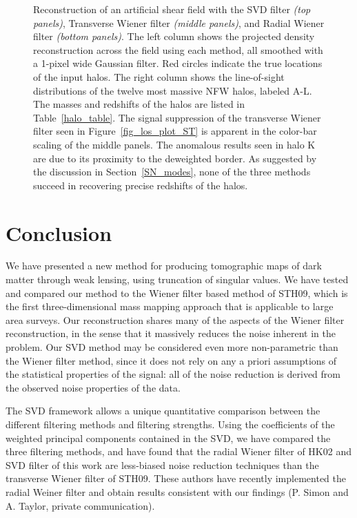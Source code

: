\documentclass[twocolumn]{emulateapj}
\begin{document}
\begin{figure*}%
 \centering
 \caption{
   Reconstruction of an artificial shear field with the 
   SVD filter \textit{(top panels)}, 
   Transverse Wiener filter \textit{(middle panels)}, 
   and Radial Wiener filter \textit{(bottom panels)}.  
   The left column shows the projected density reconstruction
   across the field using each method, all
   smoothed with a 1-pixel wide Gaussian filter.  
   Red circles indicate the true locations of the input halos.
   The right column shows the line-of-sight distributions of the
   twelve most massive NFW halos, labeled A-L.  The masses and redshifts of
   the halos are listed in Table~\ref{halo_table}.
   The signal suppression of the transverse Wiener filter seen in 
   Figure~\ref{fig_los_plot_ST} is apparent in the color-bar scaling
   of the middle panels. The anomalous results seen in halo K are due to
   its proximity to the deweighted border.  As suggested by the discussion
   in Section~\ref{SN_modes}, none of the three methods succeed 
   in recovering precise redshifts of the halos.
  \label{fig_many_halos} }
\end{figure*} 

\begin{table}
\centering
\caption{Masses and redshifts of halos in Figure~\ref{fig_many_halos}.}
\label{halo_table}

\end{table} 


\section{Conclusion}
\label{Conclusions}

We have presented a new method for producing tomographic maps of dark matter
through weak lensing, using truncation of singular values.  We have
tested and compared our method to the Wiener filter based
method of STH09, which is the first three-dimensional mass mapping
approach that is applicable to large area surveys. Our reconstruction
shares many of the aspects of the Wiener filter reconstruction,
in the sense that it massively reduces the noise inherent in the problem.
Our SVD method may be considered even more non-parametric
than the Wiener filter method, since it does not rely on any a priori 
assumptions of the statistical properties of the signal: all of the noise 
reduction is derived from the observed noise properties of the data.

The SVD framework allows a unique quantitative comparison between the
different filtering methods and filtering strengths.  Using the
coefficients of the weighted principal components contained in the SVD,
we have compared the three filtering methods, and have found that 
the radial Wiener filter of HK02 and SVD filter of this work are 
less-biased noise reduction techniques than the transverse Wiener filter
of STH09.  These authors have recently implemented the radial Weiner 
filter and obtain results consistent with our findings (P. Simon and 
A. Taylor, private communication).
\end{document}

